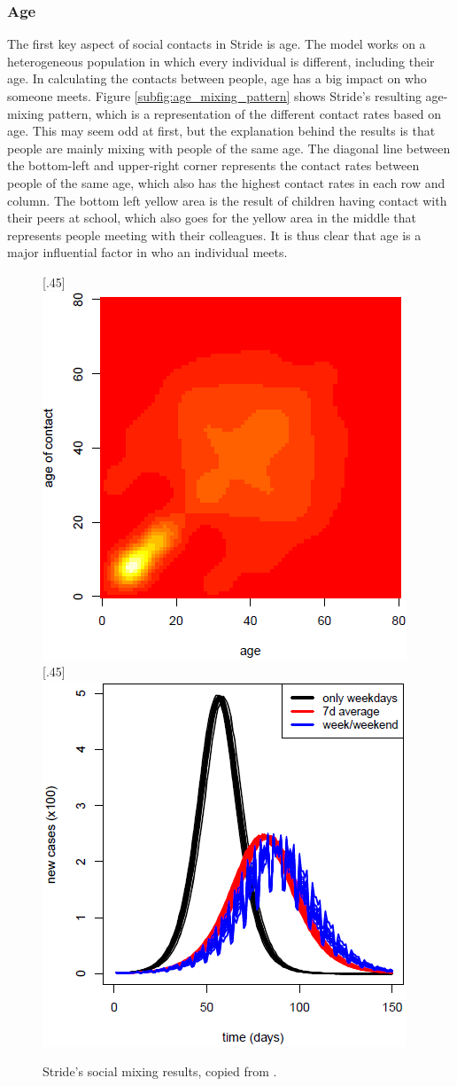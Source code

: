 \subsubsection{Age}
\label{subsec:age}
The first key aspect of social contacts in Stride is age. The model works on a heterogeneous population in which every individual is different, including their age. In calculating the contacts between people, age has a big impact on who someone meets. Figure \ref{subfig:age_mixing_pattern} shows Stride's resulting age-mixing pattern, which is a representation of the different contact rates based on age. This may seem odd at first, but the explanation behind the results is that people are mainly mixing with people of the same age. The diagonal line between the bottom-left and upper-right corner represents the contact rates between people of the same age, which also has the highest contact rates in each row and column. The bottom left yellow area is the result of children having contact with their peers at school, which also goes for the yellow area in the middle that represents people meeting with their colleagues. It is thus clear that age is a major influential factor in who an individual meets.

\begin{figure}
    \centering
    [.45\textwidth]{
        \includegraphics[width=.45\textwidth]{3 - Stride/fig/age-mixing_patterns.png}}
    \hfill
    [.45\textwidth]{
        \includegraphics[width=.45\textwidth]{3 - Stride/fig/type_of_days.png}}
    \caption{Stride's social mixing results, copied from \cite{stride}.}
    \label{fig:stride_discussion_results}
\end{figure}

